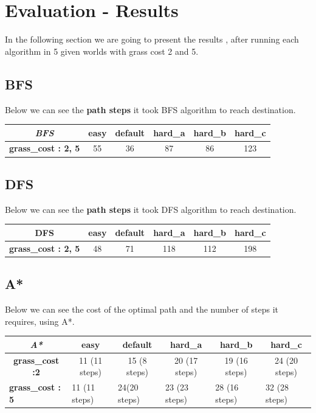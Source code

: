 \documentclass{article}
\begin{document}
    
\section{Evaluation - Results}
    In the following section we are going to present the results , after running each algorithm in 5 given worlds with grass cost 2 and 5.
\subsection{BFS}   
Below we can see the \textbf{path steps} it took BFS algorithm to reach destination.
\begin{table}[!htb]
\centering
\begin{tabular}{|c|c|c|c|c|c|}
\hline
\textit{\textbf{BFS}} & \textbf{easy} & \textbf{default} & \textbf{hard\_a} & \textbf{hard\_b} & \textbf{hard\_c} \\ \hline
\textbf{grass\_cost : 2, 5} & 55 & 36 & 87 & 86 & 123 \\ \hline
\end{tabular}
\end{table}

\subsection{DFS}
Below we can see the \textbf{path steps} it took DFS algorithm to reach destination.

\begin{table}[!htb]
\centering
\begin{tabular}{|c|c|c|c|c|c|}
\hline
\textbf{DFS}              & \textbf{easy} & \textbf{default} & \textbf{hard\_a} & \textbf{hard\_b} & \textbf{hard\_c} \\ \hline
\textbf{grass\_cost : 2, 5} & 48            & 71               & 118              & 112              & 198              \\ \hline
\end{tabular}
\end{table}
\subsection{A*}
Below we can see the cost of the optimal path and the number of steps it requires, using A*.
\begin{table}[!htb]
\centering
\begin{tabular}{|c|c|c|c|c|c|}
\hline
\textit{\textbf{A*}} & \textbf{easy} & \textbf{default} & \textbf{hard\_a} & \textbf{hard\_b} & \textbf{hard\_c} \\ \hline
\textbf{grass\_cost :2} & 11 (11 steps) & 15 (8 steps) & 20 (17 steps) & 19 (16 steps) & 24 (20 steps) \\ \hline
\multicolumn{1}{|l|}{\textbf{grass\_cost : 5}} & \multicolumn{1}{l|}{11 (11 steps)} & \multicolumn{1}{l|}{24(20 steps)} & \multicolumn{1}{l|}{23 (23 steps)} & \multicolumn{1}{l|}{28 (16 steps)} & \multicolumn{1}{l|}{32 (28 steps)} \\ \hline
\end{tabular}
\end{table}
\end{document}
